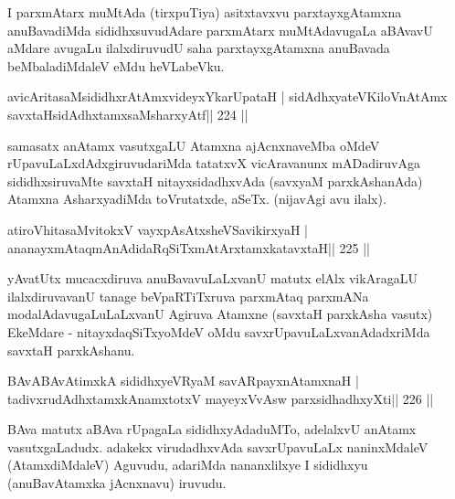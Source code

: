 \begin{artha}
I  parxmAtarx muMtAda (tirxpuTiya) asitxtavxvu parxtayxgAtamxna anuBavadiMda sididhxsuvudAdare parxmAtarx muMtAdavugaLa aBAvavU aMdare avugaLu ilalxdiruvudU saha parxtayxgAtamxna anuBavada beMbaladiMdaleV eMdu heVLabeVku.
\end{artha}


\begin{shl}
avicAritasaMsididhxrAtAmxvideyxYkarUpataH |
sidAdhxyateV\s KiloV\s nAtAmx savxtaHsidAdhxtamxsaMsharxyAtf\hfill || 224 ||
\end{shl}

\begin{artha}
samasatx anAtamx vasutxgaLU Atamxna ajAcnxnaveMba oMdeV rUpavuLaLxdAdxgiruvudariMda tatatxvX vicAravanunx mADadiruvAga sididhxsiruvaMte savxtaH nitayxsidadhxvAda (savxyaM parxkAshanAda) Atamxna AsharxyadiMda toVrutatxde, aSeTx. (nijavAgi avu ilalx).
\end{artha}


\begin{shl}
atiroVhitasaMvitokxV vayxpAsAtxsheVSavikirxyaH |
ananayxmAtaqmAnAdidaRqSiTxmAtArxtamxkatavxtaH\hfill || 225 ||
\end{shl}

\begin{artha}
yAvatUtx mucacxdiruva anuBavavuLaLxvanU matutx elAlx vikAragaLU ilalxdiruvavanU tanage beVpaRTiTxruva parxmAtaq parxmANa modalAdavugaLuLaLxvanU Agiruva Atamxne (savxtaH parxkAsha vasutx) EkeMdare - nitayxdaqSiTxyoMdeV oMdu savxrUpavuLaLxvanAdadxriMda savxtaH parxkAshanu.
\end{artha}

\begin{shl}
BAvABAvAtimxkA sididhxyeVRyaM savAR\s payxnAtamxnaH |
tadivxrudAdhxtamxkAnamxtotxV mayeyxVvAsw parxsidhadhxyXti\hfill || 226 ||
\end{shl}

\begin{artha}
BAva matutx aBAva rUpagaLa sididhxyAdaduMTo, adelalxvU anAtamx vasutxgaLadudx. adakekx virudadhxvAda savxrUpavuLaLx naninxMdaleV (AtamxdiMdaleV) Aguvudu, adariMda nananxlilxye I sididhxyu (anuBavAtamxka jAcnxnavu) iruvudu.
\end{artha}

